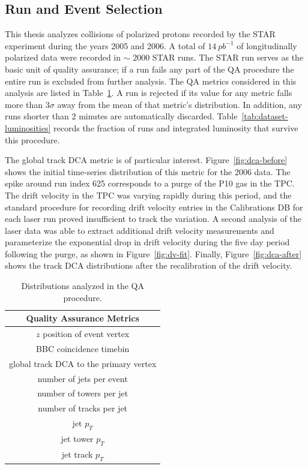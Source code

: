 
\subsection{Run and Event Selection}

This thesis analyzes collisions of polarized protons recorded by the STAR
experiment during the years 2005 and 2006. A total of \(14~pb^{-1}\) of
longitudinally polarized data were recorded in $\sim$ 2000 STAR runs. The STAR
run serves as the basic unit of quality assurance; if a run fails any part of
the QA procedure the entire run is excluded from further analysis. The QA
metrics considered in this analysis are listed in Table~\ref{tab:qa-metrics}. A
run is rejected if its value for any metric falls more than 3$\sigma$ away from
the mean of that metric's distribution. In addition, any runs shorter than 2
minutes are automatically discarded. Table~\ref{tab:dataset-luminosities}
records the fraction of runs and integrated luminosity that survive this
procedure.

The global track DCA metric is of particular interest.
Figure~\ref{fig:dca-before} shows the initial time-series distribution of this
metric for the 2006 data. The spike around run index 625 corresponds to a purge
of the P10 gas in the TPC. The drift velocity in the TPC was varying rapidly
during this period, and the standard procedure for recording drift velocity
entries in the Calibrations DB for each laser run proved insufficient to track
the variation. A second analysis of the laser data was able to extract
additional drift velocity measurements and parameterize the exponential drop in
drift velocity during the five day period following the purge, as shown in
Figure~\ref{fig:dv-fit}. Finally, Figure~\ref{fig:dca-after} shows the track DCA
distributions after the recalibration of the drift velocity.

\begin{table}
  \centering
  \begin{tabular}{|c|}
    \hline
    Quality Assurance Metrics \\
    \hline
    $z$ position of event vertex \\
    BBC coincidence timebin \\
    global track DCA to the primary vertex \\
    number of jets per event \\
    number of towers per jet \\
    number of tracks per jet \\
    jet $p_T$ \\
    jet tower $p_T$ \\
    jet track $p_T$ \\
    \hline
  \end{tabular}
  \caption{Distributions analyzed in the QA procedure.}
  \label{tab:qa-metrics}
\end{table}

